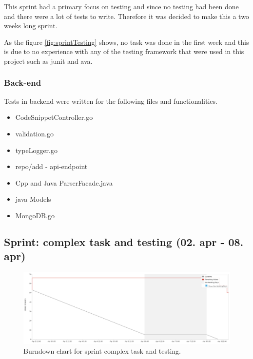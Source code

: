 This \gls{sprint} had a primary focus on testing and since no testing had been done and there were a lot of tests to write. Therefore it was decided to make this a two weeks long \gls{sprint}.

As the figure \ref{fig:sprintTesting} shows, no task was done in the first week and this is due to no experience with any of the testing framework that were used in this project such as \gls{junit} and \gls{ava}. 

\subsubsection{Back-end}
Tests in \gls{backend} were written for the following files and functionalities.
\begin{itemize}
    \item CodeSnippetController.go
    \item validation.go
    \item typeLogger.go
    \item repo/add - \gls{api}-endpoint
    \item Cpp and Java ParserFacade.java
    \item java Models
    \item MongoDB.go
\end{itemize}

\subsection{Sprint: complex task and testing (02. apr - 08. apr)}
\begin{figure}[H] 
    \includegraphics[width=\textwidth]{inc/images/sprints/sprintComplexTaskAndTest020419-080419.png}
    \caption{Burndown chart for sprint complex task and testing.}
    \label{fig:sprintComplexTaskAndTesting}
\end{figure}

